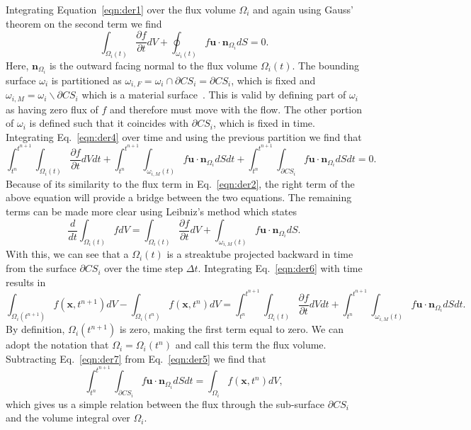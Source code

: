 Integrating Equation~\ref{eqn:der1} over the flux volume $\Omega_i$ and again using Gauss' theorem on the second term we find 
\begin{equation}
\int_{\Omega_i(t)} \frac{\partial f}{\partial t} dV  + \oint_{\omega_i(t)} f \bm{u} \cdot \bm{n}_{\Omega_i} dS = 0.
\label{eqn:der4}
\end{equation}
Here, $\bm{n}_{\Omega_i}$ is the outward facing normal to the flux volume $\Omega_i(t)$. The bounding surface $\omega_i$ is partitioned as $\omega_{i,F} = \omega_i \cap \partial CS_i = \partial CS_i$, which is fixed and $\omega_{i,M} = \omega_i \backslash \partial CS_i $ which is a material surface~\cite{Owkes2017}. This is valid by defining part of $\omega_i$ as having zero flux of $f$ and therefore must move with the flow. The other portion of $\omega_i$ is defined such that it coincides with $\partial CS_i$, which is fixed in time. Integrating Eq.~\ref{eqn:der4} over time and using the previous partition we find that 
\begin{equation}
\int_{t^n}^{t^{n+1}} \int_{\Omega_i(t)} \frac{\partial f}{\partial t} dV dt + \int_{t^n}^{t^{n+1}} \int_{\omega_{i,M}(t)} f \bm{u} \cdot \bm{n}_{\Omega_i} dS dt + 	\int_{t^n}^{t^{n+1}} \int_{\partial CS_i} f \bm{u} \cdot \bm{n}_{\Omega_i} dS dt = 0.
\label{eqn:der5}
\end{equation}
Because of its similarity to the flux term in Eq.~\ref{eqn:der2}, the right term of the above equation will provide a bridge between the two equations. The remaining terms can be made more clear using Leibniz's method which states 
\begin{equation}
\frac{d}{dt} \int_{\Omega_i(t)} f dV = \int_{\Omega_i(t)} \frac{\partial f}{\partial t} dV + \int_{\omega_{i,M}(t)} f \bm{u} \cdot \bm{n}_{\Omega_i} dS.
\label{eqn:der6}
\end{equation}
With this, we can see that a $\Omega_i(t)$ is a streaktube projected backward in time from the surface $\partial CS_i$ over the time step $\Delta t$. Integrating Eq.~\ref{eqn:der6} with time results in 
\begin{equation}
\int_{\Omega_i(t^{n+1})} f (\bm{x} , t^{n+1}) dV - \int_{\Omega_i(t^{n})} f (\bm{x} , t^{n}) dV  = \int_{t^n}^{t^{n+1}}\int_{\Omega_i(t)} \frac{\partial f}{\partial t} dV dt+ \int_{t^n}^{t^{n+1}} \int_{\omega_{i,M}(t)} f \bm{u} \cdot \bm{n}_{\Omega_i} dS dt.
\label{eqn:der7}
\end{equation}
By definition, $\Omega_i(t^{n+1})$ is zero, making the first term equal to zero. We can adopt the notation that $\Omega_i=\Omega_i(t^{n})$ and call this term the flux volume. Subtracting Eq.~\ref{eqn:der7} from Eq.~\ref{eqn:der5} we find that 
\begin{equation}
\int_{t^n}^{t^{n+1}}\int_{\partial CS_i}  f \bm{u} \cdot \bm{n}_{\Omega_i} dS dt = \int_{\Omega_i} f (\bm{x} , t^{n}) dV, 
\label{eqn:der8}
\end{equation}
which gives us a simple relation between the flux through the sub-surface $\partial CS_i$ and the volume integral over $\Omega_i$.

